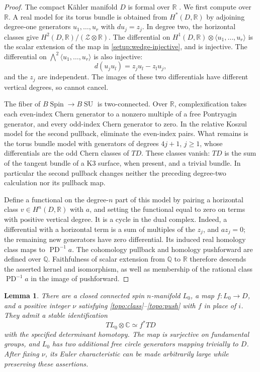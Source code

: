 \documentclass[11pt]{article}
\numberwithin{equation}{section}
\newtheorem{lemma}[theorem]{Lemma}
\theoremstyle{definition}
\theoremstyle{remark}
\begin{document}
\begin{proof}
The compact K\"ahler manifold $D$ is formal over $\mathbb R$
\cite{DeligneGriffithsMorganSullivan}.  We first compute over $\mathbb R$.
A real model for its torus bundle is obtained from $H^*(D,\mathbb R)$
by adjoining degree-one
generators $u_1,\ldots,u_r$ with $du_j=z_j$.  In degree two, the
horizontal classes give $H^2(D,\mathbb R)/(\mathcal Z\otimes\mathbb R)$.
The differential on
$H^1(D,\mathbb R)\otimes\langle u_1,\ldots,u_r\rangle$ is the scalar
extension of the map in \eqref{setup:wedge-injective}, and is
injective.  The differential
on $\bigwedge^2\langle u_1,\ldots,u_r\rangle$ is also injective:
\[
 d(u_j u_l)=z_j u_l-z_l u_j,
\]
and the $z_j$ are independent.  The images of these two differentials
have different vertical degrees, so cannot cancel.

The fiber of $B\operatorname{Spin}\to B\operatorname{SU}$ is two-connected.  Over $\mathbb R$,
complexification takes each even-index Chern generator to a nonzero
multiple of a free Pontryagin generator, and every odd-index Chern
generator to zero.  In the relative Koszul model for the second
pullback, eliminate the even-index pairs.  What remains is the torus
bundle model with generators of degrees $4j+1$, $j\geq1$, whose
differentials are the odd Chern classes of $TD$.  These classes vanish:
$TD$ is the sum of the tangent bundle of a K3 surface, when present,
and a trivial bundle.  In particular the second pullback changes
neither the preceding degree-two calculation nor its pullback map.

Define a functional on the degree-$n$ part of this model by pairing
a horizontal class $v\in H^n(D,\mathbb R)$ with $a$, and setting the
functional equal to zero on terms with positive vertical degree.
It is a cycle in the dual complex.  Indeed, a differential with a
horizontal term is a sum of multiples of the $z_j$, and
$a z_j=0$; the remaining new generators have zero differential.
Its induced real homology class maps to $\operatorname{PD}^{-1}a$.
The cohomology pullback and homology pushforward are defined over
$\mathbb Q$.  Faithfulness of scalar extension from $\mathbb Q$ to $\mathbb R$ therefore
descends the asserted kernel and isomorphism, as well as membership
of the rational class $\operatorname{PD}^{-1}a$ in the image of pushforward.
\end{proof}

\begin{lemma}\label{topo:source}
There are a closed connected spin $n$-manifold $L_0$, a map
$f:L_0\to D$, and a positive integer $\nu$ satisfying
\eqref{topo:class}--\eqref{topo:push} with $f$ in place of $i$.
They admit a stable identification
\begin{equation}\label{topo:stable}
 TL_0\otimes\mathbb C\simeq f^*TD
\end{equation}
with the specified determinant homotopy.  The map is surjective on
fundamental groups, and $L_0$ has two additional free circle generators
mapping trivially to $D$.  After fixing $\nu$, its Euler characteristic
can be made arbitrarily large while preserving these assertions.
\end{lemma}
\end{document}
